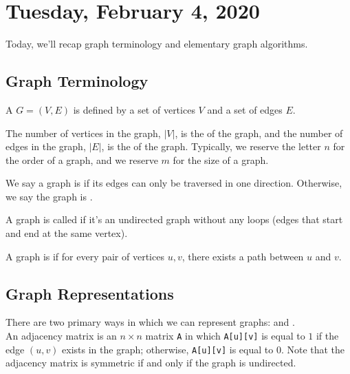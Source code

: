 \section{Tuesday, February 4, 2020}

Today, we'll recap graph terminology and elementary graph algorithms.

\subsection{Graph Terminology}

\begin{definition}
A  $G = (V, E)$ is defined by a set of vertices $V$ and a set of edges $E$.
\end{definition}

The number of vertices in the graph, $|V|$, is the  of the graph, and the number of edges in the graph, $|E|$, is the  of the graph. Typically, we reserve the letter $n$ for the order of a graph, and we reserve $m$ for the size of a graph. 
\begin{definition}
We say a graph is  if its edges can only be traversed in one direction. Otherwise, we say the graph is  .
\end{definition}


\begin{definition}
A graph is called  if it's an undirected graph without any loops (edges that start and end at the same vertex).
\end{definition}

\begin{definition}
A graph is  if for every pair of vertices $u, v$, there exists a path between $u$ and $v$.
\end{definition}


\subsection{Graph Representations}

There are two primary ways in which we can represent graphs:  and . \\


An adjacency matrix is an $n\times n$ matrix \verb!A! in which \verb!A[u][v]! is equal to $1$ if the edge $(u, v)$ exists in the graph; otherwise, \verb!A[u][v]! is equal to $0$. Note that the adjacency matrix is symmetric if and only if the graph is undirected. \\

